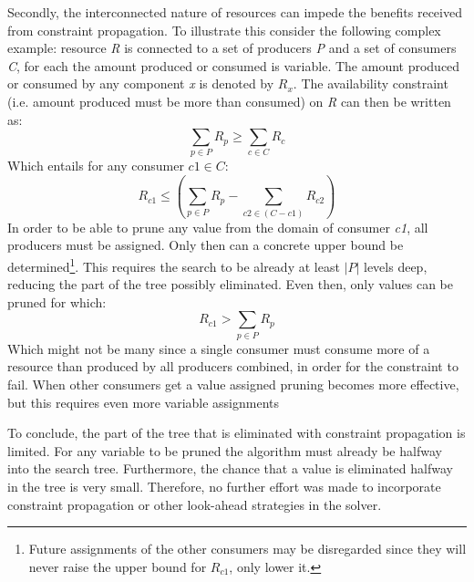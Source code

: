Secondly, the interconnected nature of resources can impede the benefits received from constraint propagation. To illustrate this consider the following complex example: resource \emph{R} is connected to a set of producers \emph{P} and a set of consumers \emph{C}, for each the amount produced or consumed is variable. The amount produced or consumed by any component \emph{x} is denoted by $R_x$. The availability constraint (i.e. amount produced must be more than consumed) on \emph{R} can then be written as:
$$\sum_{p \in P}R_p \geq \sum_{c \in C}R_c$$
Which entails for any consumer $c1 \in C$: 
$$R_{c1} \leq \left(\sum_{p \in P} R_p - \sum_{c2 \in (C-c1)} R_{c2}\right)$$
In order to be able to prune any value from the domain of consumer \emph{c1}, all producers must be assigned. Only then can a concrete upper bound be determined\footnote{Future assignments of the other consumers may be disregarded since they will never raise the upper bound for $R_{c1}$, only lower it.}. This requires the search to be already at least $|P|$ levels deep, reducing the part of the tree possibly eliminated. Even then, only values can be pruned for which:
$$R_{c1} > \sum_{p \in P} R_p$$
Which might not be many since a single consumer must consume more of a resource than produced by all producers combined, in order for the constraint to fail. When other consumers get a value assigned pruning becomes more effective, but this requires even more variable assignments

To conclude, the part of the tree that is eliminated with constraint propagation is limited. For any variable to be pruned the algorithm must already be halfway into the search tree. Furthermore, the chance that a value is eliminated halfway in the tree is very small. Therefore, no further effort was made to incorporate constraint propagation or other look-ahead strategies in the solver.



	









